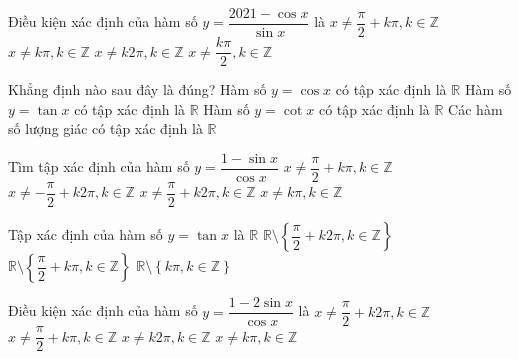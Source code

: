 \begin{ex}%
	Điều kiện xác  định của hàm số $y=\dfrac{2021-\cos x}{\sin x}$ là
	 \choice
		{$x\ne\dfrac{\pi}{2}+k\pi ,k\in\mathbb{Z}$} 
		{\True $x\ne k\pi  ,k\in\mathbb{Z}$}
		{$x\ne  k2\pi ,k\in\mathbb{Z}$}
		 {$x\ne\dfrac{k\pi}{2},k\in\mathbb{Z}$}
\end{ex}

\begin{ex}%
	Khẳng định nào sau đây  là đúng?
	 \choice
		{\True Hàm số  $y=\cos x$ có tập xác định là $\mathbb{R}$}
		{Hàm số $y=\tan x$ có tập  xác định là $\mathbb{R}$}
		{Hàm số $y=\cot x$ có tập xác định  là $\mathbb{R}$}
		{Các  hàm số lượng giác có tập xác định là $\mathbb{R}$}
\end{ex}

\begin{ex}%
	Tìm tập  xác định của hàm số $y=\dfrac{1-\sin x}{\cos x}$
	\choice 
		{\True $x\ne \dfrac{\pi }{2}+k\pi,  k\in \mathbb{Z} $}
		{$x\ne -\dfrac{\pi }{2}+k2\pi, k\in \mathbb{Z} $ } 
		{$x\ne \dfrac{\pi }{2}+k2\pi,  k\in \mathbb{Z} $}
		{$x\ne k\pi, k\in \mathbb{Z}  $}
\end{ex}

\begin{ex}%
	Tập xác định của hàm số $y=\tan x$ là 
	 \choice
		 {$\mathbb{R}$}
		 {$\mathbb{R}\setminus \left\{\dfrac{\pi}{2}+k2\pi ,k\in \mathbb{Z} \right\}$}
		{\True $\mathbb{R}\setminus  \left\{\dfrac{\pi}{2}+k\pi ,k\in \mathbb{Z} \right\}$}
		{$\mathbb{R}\setminus \left\{k\pi  ,k\in \mathbb{Z} \right\}$}
\end{ex}

\begin{ex}%
	 Điều kiện xác định của hàm số $y=\dfrac{1-2 \sin x}{\cos x}$ là
	\choice 
		{$x \neq \dfrac{\pi}{2}+k 2 \pi,  k \in \mathbb{Z}$}
		{\True $x \neq \dfrac{\pi}{2}+k \pi, k \in  \mathbb{Z}$}
		{$x \neq  k{2}\pi, k \in \mathbb{Z}$}
		{$x \neq k \pi,  k \in \mathbb{Z}$}
\end{ex}

